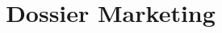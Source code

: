 \documentclass[a4paper]{../TPInsa}
\title{Dossier Marketing}
\begin{document}
	\pageTitre
	\tableMatieres

	
	
	
	
\end{document}
